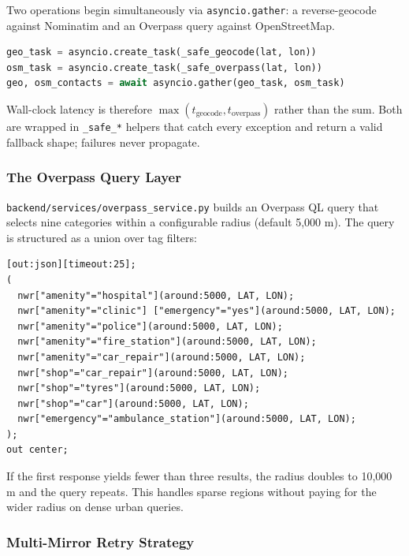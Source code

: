 \documentclass[11pt, a4paper]{article}
\newcommand{\file}[1]{\texttt{\small\color{rsblue}#1}}
\newcommand{\code}[1]{\texttt{\small#1}}
\begin{document}
Two operations begin simultaneously via \code{asyncio.gather}: a reverse-geocode against Nominatim and an Overpass query against OpenStreetMap.

\begin{lstlisting}[language=Python,caption={search\_service.py --- Phase 1 (lines 127--129)}]
geo_task = asyncio.create_task(_safe_geocode(lat, lon))
osm_task = asyncio.create_task(_safe_overpass(lat, lon))
geo, osm_contacts = await asyncio.gather(geo_task, osm_task)
\end{lstlisting}

Wall-clock latency is therefore $\max(t_{\text{geocode}}, t_{\text{overpass}})$ rather than the sum. Both are wrapped in \code{\_safe\_*} helpers that catch every exception and return a valid fallback shape; failures never propagate.

\subsubsection{The Overpass Query Layer}

\file{backend/services/overpass\_service.py} builds an Overpass QL query that selects nine categories within a configurable radius (default 5{,}000 m). The query is structured as a union over tag filters:

\begin{lstlisting}[language={},caption={Overpass QL --- categories targeted (overpass\_service.py:85--119)}]
[out:json][timeout:25];
(
  nwr["amenity"="hospital"](around:5000, LAT, LON);
  nwr["amenity"="clinic"] ["emergency"="yes"](around:5000, LAT, LON);
  nwr["amenity"="police"](around:5000, LAT, LON);
  nwr["amenity"="fire_station"](around:5000, LAT, LON);
  nwr["amenity"="car_repair"](around:5000, LAT, LON);
  nwr["shop"="car_repair"](around:5000, LAT, LON);
  nwr["shop"="tyres"](around:5000, LAT, LON);
  nwr["shop"="car"](around:5000, LAT, LON);
  nwr["emergency"="ambulance_station"](around:5000, LAT, LON);
);
out center;
\end{lstlisting}

If the first response yields fewer than three results, the radius doubles to 10{,}000 m and the query repeats. This handles sparse regions without paying for the wider radius on dense urban queries.

\subsubsection{Multi-Mirror Retry Strategy}
\end{document}
